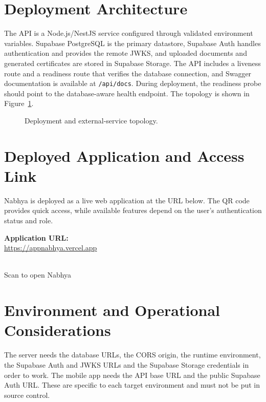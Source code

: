 \section{Deployment Architecture}
The API is a Node.js/NestJS service configured through validated environment variables. Supabase PostgreSQL is the primary datastore, Supabase Auth handles authentication and provides the remote JWKS, and uploaded documents and generated certificates are stored in Supabase Storage. The API includes a liveness route and a readiness route that verifies the database connection, and Swagger documentation is available at \texttt{/api/docs}. During deployment, the readiness probe should point to the database-aware health endpoint. The topology is shown in Figure~\ref{fig:deployment}.

\begin{figure}[H]
    \centering
    \caption{Deployment and external-service topology.}
    \label{fig:deployment}
\end{figure}

\clearpage
\section{Deployed Application and Access Link}
\label{sec:deployment-link}

Nabhya is deployed as a live web application at the URL below. The QR code provides quick access, while available features depend on the user's authentication status and role.

\begin{center}
\begin{minipage}[c]{0.58\textwidth}
\textbf{Application URL:}\\[0.08in]
\url{https://appnabhya.vercel.app}
\end{minipage}\hfill
\begin{minipage}[c]{0.34\textwidth}
\centering
{}\\[0.06in]
{\footnotesize Scan to open Nabhya}
\end{minipage}
\end{center}


\section{Environment and Operational Considerations}
The server needs the database URLs, the CORS origin, the runtime environment, the Supabase Auth and JWKS URLs and the Supabase Storage credentials in order to work. The mobile app needs the API base URL and the public Supabase Auth URL. These are specific to each target environment and must not be put in source control.

